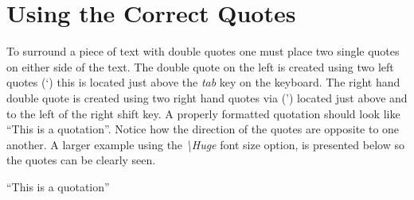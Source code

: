 \section{Using the Correct Quotes}
To surround a piece of text with double quotes one must place two single quotes on either side of the text. The double quote on the left is created using two left quotes (\lq) this is located just above the \emph{tab} key on the keyboard. The right hand double quote is created using two right hand quotes via (\rq) located just above and to the left of the right shift key. A properly formatted quotation should look like ``This is a quotation''. Notice how the direction of the quotes are opposite to one another. A larger example using the \emph{\textbackslash Huge} font size option, is presented below so the quotes can be clearly seen.

\begin{center}
\Huge{``This is a quotation''}
\end{center}



